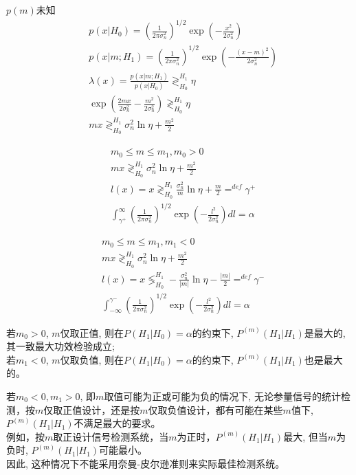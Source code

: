 \begin{frame}
$p(m)$未知
\begin{align*}
&p(x|H_0)=(\frac{1}{2\pi\sigma_n^2})^{1/2}\exp(-\frac{x^2}{2\sigma_n^2})\\
&p(x|m;H_1)=(\frac{1}{2\pi\sigma_n^2})^{1/2}\exp(-\frac{(x-m)^2}{2\sigma_n^2})\\
&\lambda(x)=\frac{p(x|m; H_1)}{p(x|H_0)}\mathop{\gtrless}_{H_0}^{H_1}\eta\\
&\exp(\frac{2mx}{2\sigma_n^2}-\frac{m^2}{2\sigma_n^2})\mathop{\gtrless}_{H_0}^{H_1}\eta\\
&mx\mathop{\gtrless}_{H_0}^{H_1}\sigma_n^2\ln\eta+\frac{m^2}{2}
\end{align*}
\end{frame}

\begin{frame}
\begin{align*}
&m_0\le m\le m_1,m_0>0\\
&mx\mathop{\gtrless}_{H_0}^{H_1}\sigma_n^2\ln\eta+\frac{m^2}{2}\\
&l(x)=x\mathop{\gtrless}_{H_0}^{H_1}\frac{\sigma_n^2}{m}\ln\eta+\frac{m}{2}\mathop{=}^{def}\gamma^+\\
&\int_{\gamma^+}^{\infty}(\frac{1}{2\pi\sigma_n^2})^{1/2}\exp(-\frac{l^2}{2\sigma_n^2})dl=\alpha
\end{align*}
\end{frame}

\begin{frame}
\begin{align*}
&m_0\le m\le m_1,m_1<0\\
&mx\mathop{\gtrless}_{H_0}^{H_1}\sigma_n^2\ln\eta+\frac{m^2}{2}\\
&l(x)=x\mathop{\lessgtr}_{H_0}^{H_1}-\frac{\sigma_n^2}{|m|}\ln\eta-\frac{|m|}{2}\mathop{=}^{def}\gamma^-\\
&\int_{-\infty}^{\gamma^-}(\frac{1}{2\pi\sigma_n^2})^{1/2}\exp(-\frac{l^2}{2\sigma_n^2})dl=\alpha
\end{align*}
\end{frame}

\begin{frame}
若$m_0>0$, $m$仅取正值, 则在$P(H_1|H_0)=\alpha$的约束下, $P^{(m)}(H_1|H_1)$是最大的,其一致最大功效检验成立;\\
若$m_1<0$, $m$仅取负值, 则在$P(H_1|H_0)=\alpha$的约束下, $P^{(m)}(H_1|H_1)$也是最大的。
\end{frame}

\begin{frame}
若$m_0<0,m_1>0$, 即$m$取值可能为正或可能为负的情况下, 无论参量信号的统计检测，按$m$仅取正值设计，还是按$m$仅取负值设计，都有可能在某些$m$值下,   $P^{(m)}(H_1|H_1)$不满足最大的要求。\\
例如，按$m$取正设计信号检测系统，当$m$为正时，$P^{(m)}(H_1|H_1)$最大, 但当$m$为负时, $P^{(m)}(H_1|H_1)$可能最小。\\
因此, 这种情况下不能采用奈曼-皮尔逊准则来实际最佳检测系统。
\end{frame}

